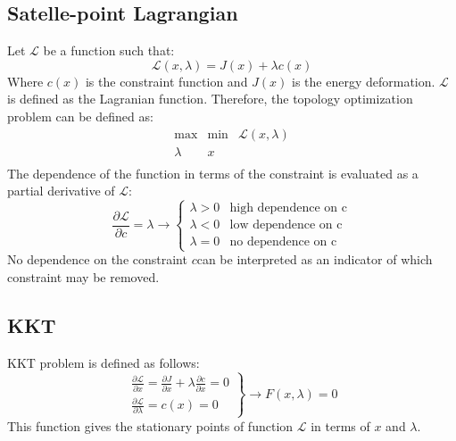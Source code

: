 \subsection{Satelle-point Lagrangian}
Let $\mathcal{L}$ be a function such that:
\begin{equation}
	\mathcal{L}(x,\lambda)=J(x)+\lambda c(x)
\end{equation}
Where $ c(x) $ is the constraint function and $ J(x) $ is the energy deformation. $\mathcal{L}$ is defined as the Lagranian function. Therefore, the topology optimization problem can be defined as:
\begin{equation}
\begin{array}{ccc}
\max &\min & \mathcal{L}(x,\lambda)\\
\lambda & x & \\
\end{array}
\end{equation}
The dependence of the function in terms of the constraint is evaluated as a partial derivative of $\mathcal{L}$:
\begin{equation}
\frac{\partial \mathcal{L}}{\partial c}=\lambda 
\rightarrow
\left\{
\begin{array}{cc}
\lambda > 0 & \text{high dependence on c}\\
\lambda < 0 & \text{low dependence on c}\\
\lambda = 0 & \text{no dependence on c} 
\end{array}\right.
 \end{equation}
No dependence on the constraint $ c $can be interpreted as an indicator of which constraint may be removed.
\subsection{KKT}
KKT problem is defined as follows:
\begin{equation}
\left.
\begin{array}{c}
\frac{\partial \mathcal{L}}{\partial x}=\frac{\partial J}{\partial x}+\lambda\frac{\partial c}{\partial x}=0\\
\frac{\partial \mathcal{L}}{\partial \lambda}=c(x)=0
\end{array}
\right\}\rightarrow
F(x,\lambda)=0
\end{equation}
This function gives the stationary points of function  $ \mathcal{L} $ in terms of $x$ and $ \lambda $.
